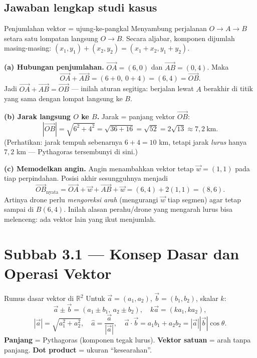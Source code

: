 \subsection*{Jawaban lengkap studi kasus}

\begin{ingat}{Penjumlahan vektor = ujung-ke-pangkal}
Menyambung perjalanan $O\to A\to B$ setara satu lompatan langsung $O\to B$.
Secara aljabar, komponen dijumlah masing-masing: $(x_1,y_1)+(x_2,y_2)=(x_1+x_2,
y_1+y_2)$.
\end{ingat}

\textbf{(a) Hubungan penjumlahan.}
$\vec{OA}=(6,0)$ dan $\vec{AB}=(0,4)$. Maka
\[
\vec{OA}+\vec{AB}=(6+0,\ 0+4)=(6,4)=\vec{OB}.
\]
Jadi \textbf{$\vec{OA}+\vec{AB}=\vec{OB}$} --- inilah aturan segitiga: berjalan
lewat $A$ berakhir di titik yang sama dengan lompat langsung ke $B$.

\textbf{(b) Jarak langsung $O$ ke $B$.} Jarak = panjang vektor $\vec{OB}$:
\[
|\vec{OB}|=\sqrt{6^2+4^2}=\sqrt{36+16}=\sqrt{52}=2\sqrt{13}\approx7{,}2\ \text{km}.
\]
(Perhatikan: jarak tempuh sebenarnya $6+4=10$ km, tetapi jarak \emph{lurus} hanya
$7{,}2$ km --- Pythagoras tersembunyi di sini.)

\textbf{(c) Memodelkan angin.} Angin menambahkan vektor tetap $\vec w=(1,1)$ pada
tiap perpindahan. Posisi akhir sesungguhnya menjadi
\[
\vec{OB}_{\text{nyata}}=\vec{OA}+\vec w+\vec{AB}+\vec w=(6,4)+2(1,1)=(8,6).
\]
Artinya drone perlu \emph{mengoreksi arah} (mengurangi $\vec w$ tiap segmen) agar
tetap sampai di $B(6,4)$. Inilah alasan perahu/drone yang mengarah lurus bisa
melenceng: ada vektor lain yang ikut menjumlah.

\section*{Subbab 3.1 — Konsep Dasar dan Operasi Vektor}

\begin{ingat}{Rumus dasar vektor di $\mathbb{R}^2$}
Untuk $\vec a=(a_1,a_2)$, $\vec b=(b_1,b_2)$, skalar $k$:
\[
\vec a\pm\vec b=(a_1\pm b_1,\ a_2\pm b_2),\quad k\vec a=(ka_1,ka_2),
\]
\[
|\vec a|=\sqrt{a_1^2+a_2^2},\quad \hat a=\frac{\vec a}{|\vec a|},\quad
\vec a\cdot\vec b=a_1b_1+a_2b_2=|\vec a||\vec b|\cos\theta.
\]
\textbf{Panjang} = Pythagoras (komponen tegak lurus). \textbf{Vektor satuan} =
arah tanpa panjang. \textbf{Dot product} = ukuran ``kesearahan''.
\end{ingat}


